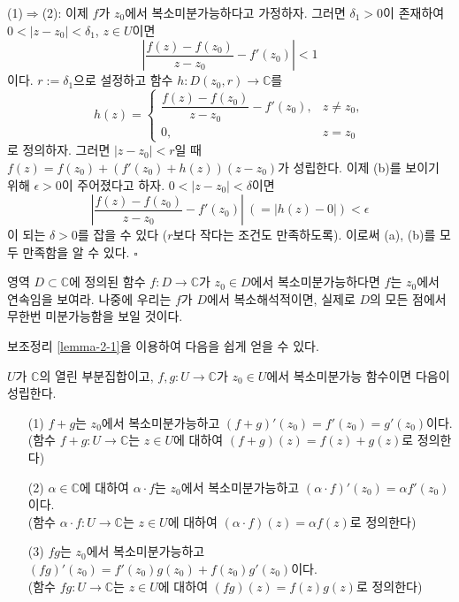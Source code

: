 (1)$\Rightarrow$(2):
이제 $f$가 $z_0$에서 복소미분가능하다고 가정하자. 
그러면 $\delta_1>0$이 존재하여 \\
$0<|z-z_0|<\delta_1$, $z\in U$이면 
\[
\left|  \dfrac{f(z) - f(z_0)}{z - z_0}  - f'(z_0) \right| < 1
\]
이다.
$r:=\delta_1$으로 설정하고 함수 $h:D(z_0,r) \to \mathbb C$를 
\[
h(z) = \begin{cases}
\dfrac{f(z) - f(z_0)}{z - z_0} - f'(z_0), & z\ne z_0, \\
0, & z= z_0
\end{cases}
\]
로 정의하자.
그러면 $|z-z_0|<r$일 때
$f(z) = f(z_0) + \left( f'(z_0) + h(z)\right) (z - z_0)$가 성립한다.
이제 (b)를 보이기 위해 $\epsilon>0$이 주어졌다고 하자.
$0<|z-z_0|<\delta$이면
\[
\left|  \dfrac{f(z) - f(z_0)}{z - z_0}  - f'(z_0) \right| \ \left( = |h(z) - 0| \right) < \epsilon
\]
이 되는 $\delta>0$를 잡을 수 있다 ($r$보다 작다는 조건도 만족하도록).
이로써 (a), (b)를 모두 만족함을 알 수 있다. \hfill $\square$

\begin{salt_exercise} \label{ex-2-3}
영역 $D\subset \mathbb C$에 정의된 함수 $f:D\to \mathbb C$가 
$z_0\in D$에서 복소미분가능하다면 $f$는 $z_0$에서 연속임을 보여라.
나중에 우리는 $f$가 $D$에서 복소해석적이면, 
실제로 $D$의 모든 점에서 무한번 미분가능함을 보일 것이다.
\end{salt_exercise}

보조정리 \ref{lemma-2-1}을 이용하여 다음을 쉽게 얻을 수 있다.

\begin{saltprop}{}{} \label{prop-2-1}
$U$가 $\mathbb C$의 열린 부분집합이고,
$f,g: U\to \mathbb C$가 $z_0\in U$에서 복소미분가능 함수이면
다음이 성립한다.
\begin{itemize}
\item[(1)] $f+g$는 $z_0$에서 복소미분가능하고
$(f+g)'(z_0) = f'(z_0) = g'(z_0)$이다. \\
(함수 $f+g:U\to\mathbb C$는 $z\in U$에 대하여 $(f+g)(z) = f(z)+g(z)$로 정의한다)
\item[(2)] $\alpha\in\mathbb C$에 대하여 $\alpha\cdot f$는 $z_0$에서 복소미분가능하고
$(\alpha\cdot f)'(z_0) = \alpha f'(z_0)$이다. \\
(함수 $\alpha \cdot f:U\to\mathbb C$는 $z\in U$에 대하여 
$(\alpha \cdot f)(z) = \alpha f(z)$로 정의한다)
\item[(3)] $fg$는 $z_0$에서 복소미분가능하고
$(fg)'(z_0) = f'(z_0)g(z_0) + f(z_0)g'(z_0)$이다.\\
(함수 $fg:U\to\mathbb C$는 $z\in U$에 대하여 
$(fg)(z)= f(z)g(z)$로 정의한다)
\end{itemize}
\end{saltprop}

